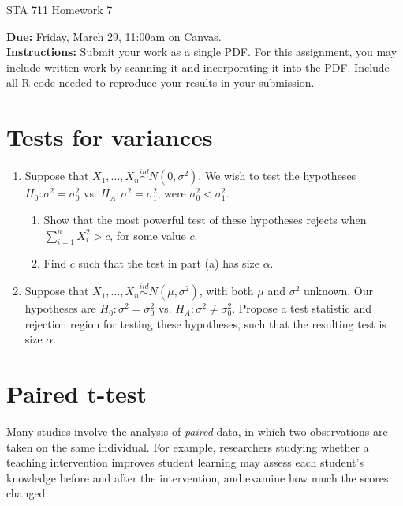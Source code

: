\documentclass[11pt]{article}
\begin{document}
\begin{center}
\Large
STA 711 Homework 7\\
\normalsize
\vspace{5mm}
\end{center}

\noindent \textbf{Due:} Friday, March 29, 11:00am on Canvas.\\ 

\noindent \textbf{Instructions:} Submit your work as a single PDF. For this assignment, you may include written work by scanning it and incorporating it into the PDF. Include all R code needed to reproduce your results in your submission.

\section*{Tests for variances}


\begin{enumerate}

\item Suppose that $X_1,...,X_n \overset{iid}{\sim} N(0, \sigma^2)$. We wish to test the hypotheses $H_0: \sigma^2 = \sigma_0^2$ vs. $H_A: \sigma^2 = \sigma_1^2$, were $\sigma_0^2 < \sigma_1^2$.

\begin{enumerate}
\item Show that the most powerful test of these hypotheses rejects when $\sum \limits_{i=1}^n X_i^2 > c$, for some value $c$.
\item Find $c$ such that the test in part (a) has size $\alpha$.
\end{enumerate}

\item Suppose that $X_1,...,X_n \overset{iid}{\sim} N(\mu, \sigma^2)$, with both $\mu$ and $\sigma^2$ unknown. Our hypotheses are $H_0: \sigma^2 = \sigma_0^2$ vs. $H_A: \sigma^2 \neq \sigma_0^2$. Propose a test statistic and rejection region for testing these hypotheses, such that the resulting test is size $\alpha$.


\end{enumerate}

\section*{Paired t-test}

Many studies involve the analysis of \textit{paired} data, in which two observations are taken on the same individual. For example, researchers studying whether a teaching intervention improves student learning may assess each student's knowledge before and after the intervention, and examine how much the scores changed.\\
\end{document}
